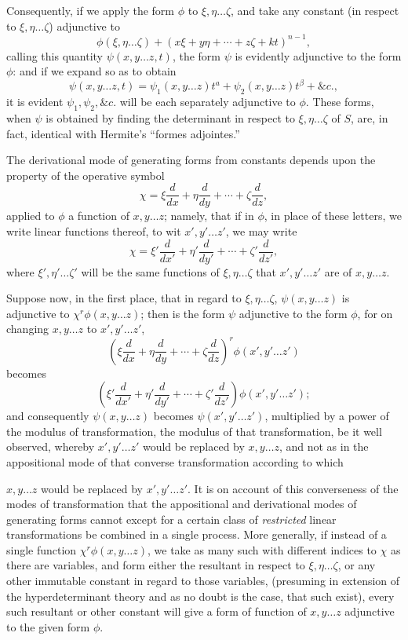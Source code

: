 \documentclass[11pt]{article}
\newcommand{\sourcepage}[1]{\marginpar{\scriptsize p.~#1}}
\begin{document}
{{Consequently, if we apply the form $\phi$ to $\xi,\eta\ldots\zeta$, and take any constant (in respect to $\xi,\eta\ldots\zeta$) adjunctive to
\[
 \phi(\xi,\eta\ldots\zeta)+(x\xi+y\eta+\cdots+z\zeta+kt)^{n-1},
\]
calling this quantity $\psi(x,y\ldots z,t)$, the form $\psi$ is evidently adjunctive to the form $\phi$: and if we expand so as to obtain
\[
 \psi(x,y\ldots z,t)=\psi_1(x,y\ldots z)t^a+\psi_2(x,y\ldots z)t^\beta+\&c.,
\]
it is evident $\psi_1,\psi_2,\&c.$ will be each separately adjunctive to $\phi$. These forms, when $\psi$ is obtained by finding the determinant in respect to $\xi,\eta\ldots\zeta$ of $S$, are, in fact, identical with Hermite's ``formes adjointes.''

The derivational mode of generating forms from constants depends upon the property of the operative symbol
\[
 \chi=\xi\frac{d}{dx}+\eta\frac{d}{dy}+\cdots+\zeta\frac{d}{dz},
\]
applied to $\phi$ a function of $x,y\ldots z$; namely, that if in $\phi$, in place of these letters, we write linear functions thereof, to wit $x',y'\ldots z'$, we may write
\[
 \chi=\xi'\frac{d}{dx'}+\eta'\frac{d}{dy'}+\cdots+\zeta'\frac{d}{dz'},
\]
where $\xi',\eta'\ldots\zeta'$ will be the same functions of $\xi,\eta\ldots\zeta$ that $x',y'\ldots z'$ are of $x,y\ldots z$.

Suppose now, in the first place, that in regard to $\xi,\eta\ldots\zeta$, $\psi(x,y\ldots z)$ is adjunctive to $\chi^r\phi(x,y\ldots z)$; then is the form $\psi$ adjunctive to the form $\phi$, for on changing $x,y\ldots z$ to $x',y'\ldots z'$,
\[
 \left(\xi\frac{d}{dx}+\eta\frac{d}{dy}+\cdots+\zeta\frac{d}{dz}\right)^r
 \phi(x',y'\ldots z')
\]
becomes
\[
 \left(\xi'\frac{d}{dx'}+\eta'\frac{d}{dy'}+\cdots+\zeta'\frac{d}{dz'}\right)
 \phi(x',y'\ldots z');
\]
and consequently $\psi(x,y\ldots z)$ becomes $\psi(x',y'\ldots z')$, multiplied by a power of the modulus of transformation, the modulus of that transformation, be it well observed, whereby $x',y'\ldots z'$ would be replaced by $x,y\ldots z$, and not as in the appositional mode of that converse transformation according to which

\sourcepage{187}
$x,y\ldots z$ would be replaced by $x',y'\ldots z'$. It is on account of this converseness of the modes of transformation that the appositional and derivational modes of generating forms cannot except for a certain class of \emph{restricted} linear transformations be combined in a single process. More generally, if instead of a single function $\chi^r\phi(x,y\ldots z)$, we take as many such with different indices to $\chi$ as there are variables, and form either the resultant in respect to $\xi,\eta\ldots\zeta$, or any other immutable constant in regard to those variables, (presuming in extension of the hyperdeterminant theory and as no doubt is the case, that such exist), every such resultant or other constant will give a form of function of $x,y\ldots z$ adjunctive to the given form $\phi$.

}}
\end{document}
